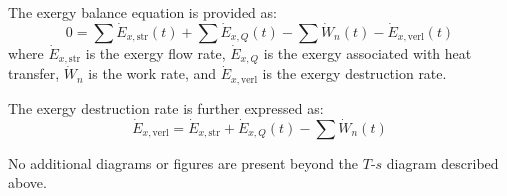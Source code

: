 The exergy balance equation is provided as:  
\[
0 = \sum \dot{E}_{x,\text{str}}(t) + \sum \dot{E}_{x,Q}(t) - \sum \dot{W}_n(t) - \dot{E}_{x,\text{verl}}(t)
\]  
where \(\dot{E}_{x,\text{str}}\) is the exergy flow rate, \(\dot{E}_{x,Q}\) is the exergy associated with heat transfer, \(\dot{W}_n\) is the work rate, and \(\dot{E}_{x,\text{verl}}\) is the exergy destruction rate.  

The exergy destruction rate is further expressed as:  
\[
\dot{E}_{x,\text{verl}} = \dot{E}_{x,\text{str}} + \dot{E}_{x,Q}(t) - \sum \dot{W}_n(t)
\]  

No additional diagrams or figures are present beyond the \(T\)-\(s\) diagram described above.